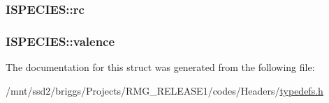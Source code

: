 \hypertarget{struct_i_s_p_e_c_i_e_s_a7d979feeaf3384f236b8053bd1158cdf}{
\subsubsection[{rc}]{ I\-S\-P\-E\-C\-I\-E\-S\-::rc}}\label{struct_i_s_p_e_c_i_e_s_a7d979feeaf3384f236b8053bd1158cdf}
\hypertarget{struct_i_s_p_e_c_i_e_s_a9ea5177c4519b0ee21950ff2cff15187}{
\subsubsection[{valence}]{ I\-S\-P\-E\-C\-I\-E\-S\-::valence}}\label{struct_i_s_p_e_c_i_e_s_a9ea5177c4519b0ee21950ff2cff15187}


The documentation for this struct was generated from the following file\-:\begin{DoxyCompactItemize}
\item 
/mnt/ssd2/briggs/\-Projects/\-R\-M\-G\-\_\-\-R\-E\-L\-E\-A\-S\-E1/codes/\-Headers/\hyperlink{_headers_2typedefs_8h}{typedefs.\-h}\end{DoxyCompactItemize}
